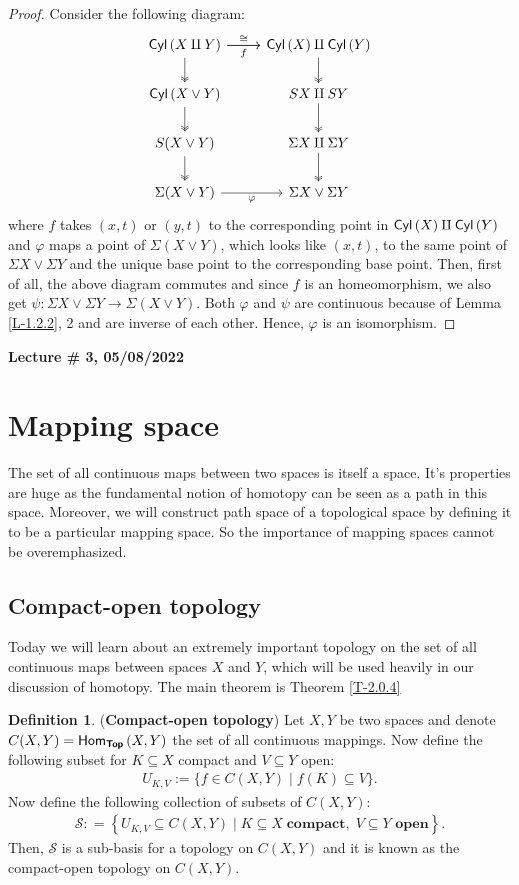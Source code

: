 \documentclass[letterpaper,11pt,twoside]{article}
\theoremstyle{definition}
\theoremstyle{definition}
\newtheorem{definition}[proposition]{Definition}
\theoremstyle{definition}
\theoremstyle{definition}
\theoremstyle{definition}
\theoremstyle{definition}
\theoremstyle{remark}
\theoremstyle{definition}
\newcommand{\cat}[1]{{\fontfamily{lmss}\selectfont 
		\text{\textbf{#1}}
}}
\newcommand{\homset}[3]{{\fontfamily{lmss}\selectfont 
		\text{Hom}_{#1}\left (#2,#3\right )
}}
\newcommand{\isom}{\cong}
\newcommand{\newlecture}[2]{\begin{center}
    \textbf{Lecture \# #1, #2}
\end{center}}
\newcommand{\cyl}[1]{{\fontfamily{lmss}\selectfont 
		\text{Cyl}\left(#1\right)
}}
\begin{document}
 \begin{proof}
 Consider the following diagram:
 \[\begin{tikzcd}
	{\cyl{X\amalg Y}} & {\cyl{X} \amalg \cyl{Y}} \\
	{\cyl{X\vee Y}} & {SX\amalg SY} \\
	{S(X\vee Y)} & {\Sigma X \amalg \Sigma Y} \\
	{\Sigma(X\vee Y)} & {\Sigma X \vee \Sigma Y}
	\arrow["\isom", from=1-1, to=1-2]
	\arrow[two heads, from=1-1, to=2-1]
	\arrow[two heads, from=2-1, to=3-1]
	\arrow[two heads, from=3-1, to=4-1]
	\arrow[two heads, from=1-2, to=2-2]
	\arrow[two heads, from=2-2, to=3-2]
	\arrow[two heads, from=3-2, to=4-2]
	\arrow["\varphi"', from=4-1, to=4-2]
	\arrow["f"', from=1-1, to=1-2]
\end{tikzcd}\]
    where $f$ takes $(x,t)$ or $(y,t)$ to the corresponding point in $\cyl{X} \amalg \cyl{Y}$ and $\varphi $ maps a point of $\Sigma (X\vee Y) $, which looks like $(x,t)$, to the same point of $\Sigma X \vee \Sigma Y$ and the unique base point to the corresponding base point. Then, first of all, the above diagram commutes and since $f$ is an homeomorphism, we also get $\psi : \Sigma X \vee \Sigma Y \to \Sigma (X\vee Y)$. Both $\varphi$ and $\psi$ are continuous because of Lemma \ref{L-1.2.2}, 2 and are inverse of each other. Hence, $\varphi$ is an isomorphism.
 \end{proof}
\newlecture{3}{05/08/2022}
\section{Mapping space}
The set of all continuous maps between two spaces is itself a space. It's properties are huge as the fundamental notion of homotopy can be seen as a path in this space. Moreover, we will construct path space of a topological space by defining it to be a particular mapping space. So the importance of mapping spaces cannot be overemphasized.
\subsection{Compact-open topology}
Today we will learn about an extremely important topology on the set of all continuous maps between spaces $X$ and $Y$, which will be used heavily in our discussion of homotopy. The main theorem is Theorem \ref{T-2.0.4}
\begin{definition}
(\textbf{Compact-open topology}) Let $X,Y$ be two spaces and denote $C(X,Y) = \homset{\cat{Top}}{X}{Y}$ the set of all continuous mappings. Now define the following subset for $K\subseteq X$ compact and $V\subseteq Y$ open:
\begin{align*}
    U_{K,V}:= \{f \in C(X,Y)\;\vert\; f(K) \subseteq V\}.
\end{align*}
Now define the following collection of subsets of $C(X,Y)$:
\begin{align*}
    \mathcal{S}: = \left\{ U_{K,V}\subseteq C(X,Y)\;\vert\; K\subseteq X \;\textbf{compact}, \;V\subseteq Y\textbf{ open}  \right\}.
\end{align*}
Then, $\mathcal{S}$ is a sub-basis for a topology on $C(X,Y)$ and it is known as the compact-open topology on $C(X,Y)$.
\end{definition}
\end{document}
